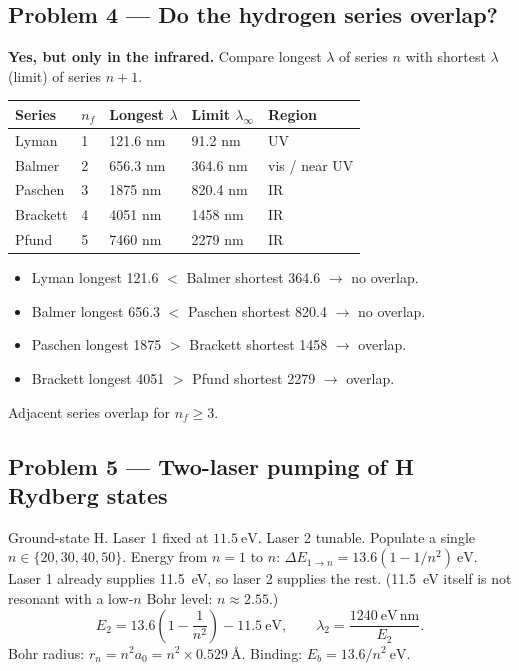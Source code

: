\documentclass[11pt,a4paper]{article}
\begin{document}
\subsection{Problem 4 --- Do the hydrogen series overlap?}
\textbf{Yes, but only in the infrared.} Compare longest \(\lambda\) of series \(n\) with shortest \(\lambda\) (limit) of series \(n+1\).

\begin{center}
\small
\begin{tabular}{@{}lllll@{}}
\toprule
Series & \(n_f\) & Longest \(\lambda\) & Limit \(\lambda_\infty\) & Region \\
\midrule
Lyman & 1 & 121.6 nm & 91.2 nm & UV \\
Balmer & 2 & 656.3 nm & 364.6 nm & vis / near UV \\
Paschen & 3 & 1875 nm & 820.4 nm & IR \\
Brackett & 4 & 4051 nm & 1458 nm & IR \\
Pfund & 5 & 7460 nm & 2279 nm & IR \\
\bottomrule
\end{tabular}
\end{center}
\begin{itemize}
\item Lyman longest 121.6 \(<\) Balmer shortest 364.6 \(\to\) no overlap.
\item Balmer longest 656.3 \(<\) Paschen shortest 820.4 \(\to\) no overlap.
\item Paschen longest 1875 \(>\) Brackett shortest 1458 \(\to\) overlap.
\item Brackett longest 4051 \(>\) Pfund shortest 2279 \(\to\) overlap.
\end{itemize}
Adjacent series overlap for \(n_f\ge 3\).

\subsection{Problem 5 --- Two-laser pumping of H Rydberg states}
Ground-state H. Laser 1 fixed at \(11.5~\mathrm{eV}\). Laser 2 tunable. Populate a single \(n\in\{20,30,40,50\}\).
Energy from \(n=1\) to \(n\): \(\Delta E_{1\to n}=13.6(1-1/n^2)~\mathrm{eV}\).
Laser 1 already supplies 11.5~eV, so laser 2 supplies the rest.
(11.5~eV itself is not resonant with a low-\(n\) Bohr level: \(n\approx 2.55\).)
\[
E_2=13.6\left(1-\frac{1}{n^2}\right)-11.5~\mathrm{eV},\qquad
\lambda_2=\frac{1240~\mathrm{eV\,nm}}{E_2}.
\]
Bohr radius: \(r_n=n^2 a_0=n^2\times 0.529~\text{\AA}\). Binding: \(E_b=13.6/n^2~\mathrm{eV}\).
\end{document}
